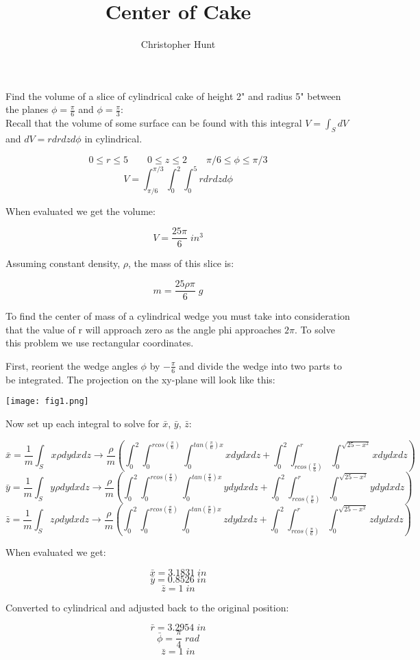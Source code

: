\documentclass[11pt]{article}
\title{Center of Cake}
\author{Christopher Hunt}
\date{}
\begin{document}
\pagestyle{fancy}
\fancyhf{}
\rhead{\thepage}
\maketitle

Find the volume of a slice of cylindrical cake of height 2" and radius 5" between the planes $\phi = \frac{\pi}{6}$ and $\phi = \frac{\pi}{3}$:
\\

Recall that the volume of some surface can be found with this integral $V = \int_SdV$ and $dV = rdrdzd\phi$ in cylindrical.

$$0 \leq r \leq 5 \qquad 0 \leq z \leq 2 \qquad \pi/6 \leq \phi \leq \pi/3$$
$$V = \int_{\pi/6}^{\pi/3} \int_0^2\int_0^5 rdrdzd\phi$$

When evaluated we get the volume:

$$V = \frac{25\pi}{6} \; in^3$$

Assuming constant density, $\rho$, the mass of this slice is:

$$m = \frac{25\rho\pi}{6}\; g$$

To find the center of mass of a cylindrical wedge you must take into consideration that the value of r will approach zero as the angle phi approaches $2\pi$. To solve this problem we use rectangular coordinates.

First, reorient the wedge angles $\phi$ by $-\frac{\pi}{6}$ and divide the wedge into two parts to be integrated. The projection on the xy-plane will look like this:

\begin{center}
    \texttt{[image: fig1.png]}
\end{center}

Now set up each integral to solve for $\bar{x}$, $\bar{y}$, $\bar{z}$:



$$\bar{x} = \frac{1}{m} \int_S x\rho dydxdz \rightarrow \frac{\rho}{m} \left( \int_0^2\int_0^{rcos(\frac{\pi}{6})}\int_0^{tan(\frac{\pi}{6})x}xdydxdz + \int_0^2\int_{rcos(\frac{\pi}{6})}^r\int_0^{\sqrt{25-x^2}}xdydxdz\right)$$
$$\bar{y} = \frac{1}{m} \int_S y\rho dydxdz \rightarrow \frac{\rho}{m} \left( \int_0^2\int_0^{rcos(\frac{\pi}{6})}\int_0^{tan(\frac{\pi}{6})x}ydydxdz + \int_0^2\int_{rcos(\frac{\pi}{6})}^r\int_0^{\sqrt{25-x^2}}ydydxdz\right)$$
$$\bar{z} = \frac{1}{m} \int_S z\rho dydxdz \rightarrow \frac{\rho}{m} \left( \int_0^2\int_0^{rcos(\frac{\pi}{6})}\int_0^{tan(\frac{\pi}{6})x}zdydxdz + \int_0^2\int_{rcos(\frac{\pi}{6})}^r\int_0^{\sqrt{25-x^2}}zdydxdz\right)$$

When evaluated we get:

$$\bar{x} = 3.1831 \;in$$
$$\bar{y} = 0.8526 \;in$$
$$\bar{z} = 1 \;in$$

Converted to cylindrical and adjusted back to the original position:

$$\bar{r} = 3.2954 \;in$$
$$\bar{\phi} = \frac{\pi}{4} \;rad$$
$$\bar{z} = 1 \;in$$
\end{document}
